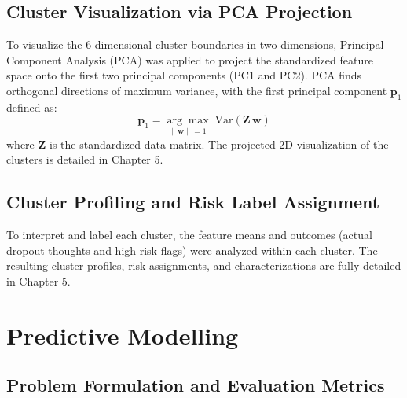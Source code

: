 \subsection{Cluster Visualization via PCA Projection}
\label{subsec:pca_clusters_method}

To visualize the 6-dimensional cluster boundaries in two dimensions, Principal Component Analysis (PCA) was applied to project the standardized feature space onto the first two principal components (PC1 and PC2). PCA finds orthogonal directions of maximum variance, with the first principal component $\mathbf{p}_1$ defined as:
\begin{equation}
    \mathbf{p}_1 = \underset{\|\mathbf{w}\| = 1}{\arg\max}\; \mathrm{Var}\left(\mathbf{Z}\,\mathbf{w}\right)
    \label{eq:pca}
\end{equation}
where $\mathbf{Z}$ is the standardized data matrix. The projected 2D visualization of the clusters is detailed in Chapter 5.

\subsection{Cluster Profiling and Risk Label Assignment}
\label{subsec:cluster_profiling_method}

To interpret and label each cluster, the feature means and outcomes (actual dropout thoughts and high-risk flags) were analyzed within each cluster. The resulting cluster profiles, risk assignments, and characterizations are fully detailed in Chapter 5.

\section{Predictive Modelling}
\label{sec:predictive_modelling}

\subsection{Problem Formulation and Evaluation Metrics}
\label{subsec:eval_metrics}

